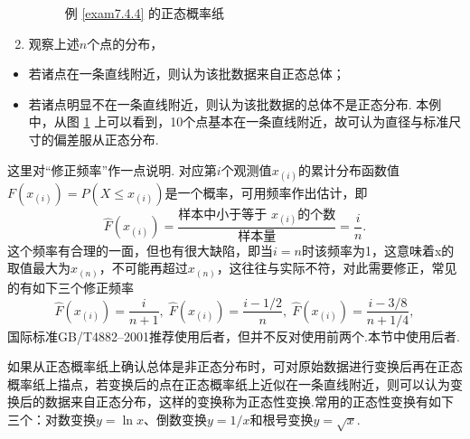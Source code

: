 \begin{example}
\begin{enumerate}
\begin{figure}[!ht]
    \caption{例 \ref{exam7.4.4} 的正态概率纸}\label{fig7.4.2}
      \end{figure}
    \item 观察上述$n$个点的分布，
  \end{enumerate}
  \begin{itemize}
    \item 若诸点在一条直线附近，则认为该批数据来自正态总体；
    \item 若诸点明显不在一条直线附近，则认为该批数据的总体不是正态分布. 本例中，从图 \ref{fig7.4.2} 上可以看到，10个点基本在一条直线附近，故可认为直径与标准尺寸的偏差服从正态分布.
  \end{itemize}
\end{example}

这里对“修正频率”作一点说明. 对应第$i$个观测值$x_{(i)}$的累计分布函数值$F(x_{(i)})=P(X\le x_{(i)})$是一个概率，可用频率作出估计，即
\[
  \hat F(x_{(i)}) = \frac{\text{样本中小于等于
  $x_{(i)}$的个数}}{\text{样本量}} = \frac in.
\]
这个频率有合理的一面，但也有很大缺陷，即当$i=n$时该频率为1，这意味着x的取值最大为$x_{(n)}$，不可能再超过$x_{(n)}$，这往往与实际不符，对此需要修正，常见的有如下三个修正频率
\[
  \hat F(x_{(i)}) = \frac i{n+1},\; \hat F(x_{(i)}) = \frac{i-1/2}n,\; \hat F(x_{(i)}) = \frac{i-3/8}{n+1/4},
\]
国际标准GB/T4882--2001推荐使用后者，但并不反对使用前两个.本节中使用后者.

如果从正态概率纸上确认总体是非正态分布时，可对原始数据进行变换后再在正态概率纸上描点，若变换后的点在正态概率纸上近似在一条直线附近，则可以认为变换后的数据来自正态分布，这样的变换称为正态性变换.常用的正态性变换有如下三个：对数变换$y=\ln x$、倒数变换$y=1/x$和根号变换$y=\sqrt x$.

